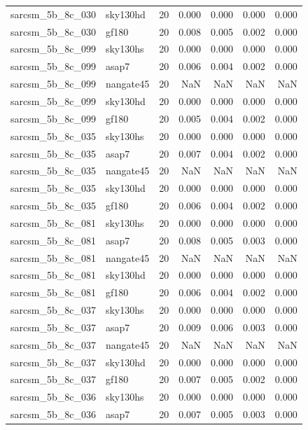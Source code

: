 \begin{tabular}{llrrrrr}
sarcsm\_5b\_8c\_030 & sky130hd & 20 & 0.000 & 0.000 & 0.000 & 0.000 \\
sarcsm\_5b\_8c\_030 & gf180 & 20 & 0.008 & 0.005 & 0.002 & 0.000 \\
sarcsm\_5b\_8c\_099 & sky130hs & 20 & 0.000 & 0.000 & 0.000 & 0.000 \\
sarcsm\_5b\_8c\_099 & asap7 & 20 & 0.006 & 0.004 & 0.002 & 0.000 \\
sarcsm\_5b\_8c\_099 & nangate45 & 20 & NaN & NaN & NaN & NaN \\
sarcsm\_5b\_8c\_099 & sky130hd & 20 & 0.000 & 0.000 & 0.000 & 0.000 \\
sarcsm\_5b\_8c\_099 & gf180 & 20 & 0.005 & 0.004 & 0.002 & 0.000 \\
sarcsm\_5b\_8c\_035 & sky130hs & 20 & 0.000 & 0.000 & 0.000 & 0.000 \\
sarcsm\_5b\_8c\_035 & asap7 & 20 & 0.007 & 0.004 & 0.002 & 0.000 \\
sarcsm\_5b\_8c\_035 & nangate45 & 20 & NaN & NaN & NaN & NaN \\
sarcsm\_5b\_8c\_035 & sky130hd & 20 & 0.000 & 0.000 & 0.000 & 0.000 \\
sarcsm\_5b\_8c\_035 & gf180 & 20 & 0.006 & 0.004 & 0.002 & 0.000 \\
sarcsm\_5b\_8c\_081 & sky130hs & 20 & 0.000 & 0.000 & 0.000 & 0.000 \\
sarcsm\_5b\_8c\_081 & asap7 & 20 & 0.008 & 0.005 & 0.003 & 0.000 \\
sarcsm\_5b\_8c\_081 & nangate45 & 20 & NaN & NaN & NaN & NaN \\
sarcsm\_5b\_8c\_081 & sky130hd & 20 & 0.000 & 0.000 & 0.000 & 0.000 \\
sarcsm\_5b\_8c\_081 & gf180 & 20 & 0.006 & 0.004 & 0.002 & 0.000 \\
sarcsm\_5b\_8c\_037 & sky130hs & 20 & 0.000 & 0.000 & 0.000 & 0.000 \\
sarcsm\_5b\_8c\_037 & asap7 & 20 & 0.009 & 0.006 & 0.003 & 0.000 \\
sarcsm\_5b\_8c\_037 & nangate45 & 20 & NaN & NaN & NaN & NaN \\
sarcsm\_5b\_8c\_037 & sky130hd & 20 & 0.000 & 0.000 & 0.000 & 0.000 \\
sarcsm\_5b\_8c\_037 & gf180 & 20 & 0.007 & 0.005 & 0.002 & 0.000 \\
sarcsm\_5b\_8c\_036 & sky130hs & 20 & 0.000 & 0.000 & 0.000 & 0.000 \\
sarcsm\_5b\_8c\_036 & asap7 & 20 & 0.007 & 0.005 & 0.003 & 0.000 \\

\end{tabular}
